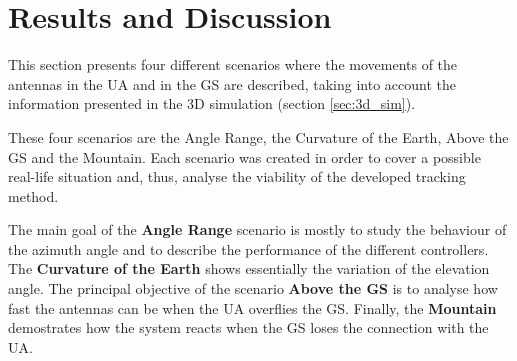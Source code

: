 \chapter{Results and Discussion}\label{ch:results}

This section presents four different scenarios where the movements of the antennas in the UA and in the GS are described, taking into account the information presented in the 3D simulation (section \ref{sec:3d_sim}).

These four scenarios are the Angle Range, the Curvature of the Earth, Above the GS and the Mountain. Each scenario was created in order to cover a possible real-life situation and, thus, analyse the viability of the developed tracking method.

The main goal of the \textbf{Angle Range} scenario is mostly to study the behaviour of the azimuth angle and to describe the performance of the different controllers. The \textbf{Curvature of the Earth} shows essentially the variation of the elevation angle. The principal objective of the scenario \textbf{Above the GS} is to analyse how fast the antennas can be when the UA overflies the GS. Finally, the \textbf{Mountain} demostrates how the system reacts when the GS loses the connection with the UA. 